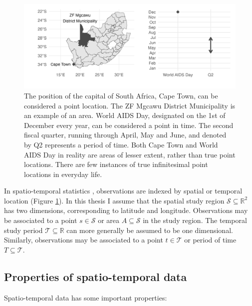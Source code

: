 \documentclass[a4paper, nobind]{templates/ociamthesis}
\begin{document}
\begin{figure}

{\centering \includegraphics[width=0.95\linewidth]{figures/bayesian/st} 

}

\caption{The position of the capital of South Africa, Cape Town, can be considered a point location. The ZF Mgcawu District Municipality is an example of an area. World AIDS Day, designated on the 1st of December every year, can be considered a point in time. The second fiscal quarter, running through April, May and June, and denoted by Q2 represents a period of time. Both Cape Town and World AIDS Day in reality are areas of lesser extent, rather than true point locations. There are few instances of true infinitesimal point locations in everyday life.}\label{fig:st}
\end{figure}

In spatio-temporal statistics \autocite{cressie2015statistics}, observations are indexed by spatial or temporal location (Figure \ref{fig:st}).
In this thesis I assume that the spatial study region \(\mathcal{S} \subseteq \mathbb{R}^2\) has two dimensions, corresponding to latitude and longitude.
Observations may be associated to a point \(s \in \mathcal{S}\) or area \(A \subseteq \mathcal{S}\) in the study region.
The temporal study period \(\mathcal{T} \subseteq \mathbb{R}\) can more generally be assumed to be one dimensional.
Similarly, observations may be associated to a point \(t \in \mathcal{T}\) or period of time \(T \subseteq \mathcal{T}\).

\hypertarget{properties-of-spatio-temporal-data}{%
\subsection{Properties of spatio-temporal data}\label{properties-of-spatio-temporal-data}}

Spatio-temporal data has some important properties:
\end{document}
